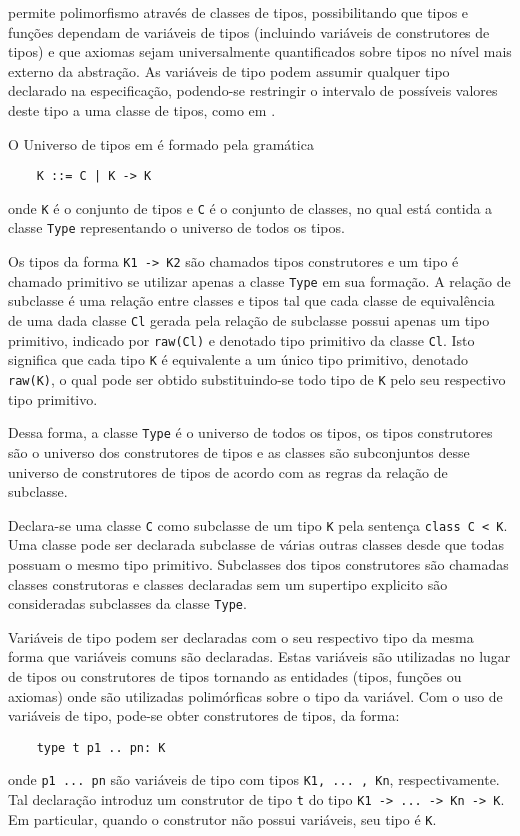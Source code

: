 \HasCASL permite polimorfismo através de classes de tipos, possibilitando que tipos e funções dependam de variáveis de tipos (incluindo variáveis de construtores de tipos) e que axiomas sejam universalmente quantificados sobre tipos no nível mais externo da abstração.
As variáveis de tipo podem assumir qualquer tipo declarado na especificação, podendo-se restringir o intervalo de possíveis valores deste tipo a uma classe de tipos, como em \Haskell.

O Universo de tipos em \HasCASL é formado pela gramática
\begin{Verbatim}
    K ::= C | K -> K
\end{Verbatim}
onde \Verb.K. é o conjunto de tipos e \Verb.C. é o conjunto de classes, no qual está contida a classe \Verb.Type. representando o universo de todos os tipos.

Os tipos da forma \Verb.K1 -> K2. são chamados tipos construtores e um tipo é chamado primitivo  se utilizar apenas a classe \Verb.Type. em sua formação.
A relação de subclasse é uma relação entre classes e tipos tal que cada classe de equivalência de uma dada classe \Verb.Cl. gerada pela relação de subclasse possui apenas um tipo primitivo, indicado por \Verb.raw(Cl). e denotado tipo primitivo da classe \Verb.Cl..
Isto significa que cada tipo \Verb.K. é equivalente a um único tipo primitivo, denotado \Verb.raw(K)., o qual pode ser obtido substituindo-se todo tipo de \Verb.K. pelo seu respectivo tipo primitivo.

Dessa forma, a classe \Verb.Type. é o universo de todos os tipos, os tipos construtores são o universo dos construtores de tipos e as classes são subconjuntos desse universo de construtores de tipos de acordo com as regras da relação de subclasse.

Declara-se uma classe \Verb.C. como subclasse de um tipo \Verb.K. pela sentença \Verb.class C < K..
Uma classe pode ser declarada subclasse de várias outras classes desde que todas possuam o mesmo tipo primitivo.
Subclasses dos tipos construtores são chamadas classes construtoras e classes declaradas sem um supertipo explicito são consideradas subclasses da classe \Verb.Type..

Variáveis de tipo podem ser declaradas com o seu respectivo tipo da mesma forma que variáveis comuns são declaradas.
Estas variáveis são utilizadas no lugar de tipos ou construtores de tipos tornando as entidades (tipos, funções ou axiomas) onde são utilizadas polimórficas sobre o tipo da variável.
Com o uso de variáveis de tipo, pode-se obter construtores de tipos, da forma:
\begin{Verbatim}
    type t p1 .. pn: K
\end{Verbatim}
onde \Verb_p1 ... pn_ são variáveis de tipo com tipos \Verb_K1, ... , Kn_, respectivamente.
Tal declaração introduz um construtor de tipo \Verb.t. do tipo \Verb_K1 -> ... -> Kn -> K_.
Em particular, quando o construtor não possui variáveis, seu tipo é \Verb.K..

